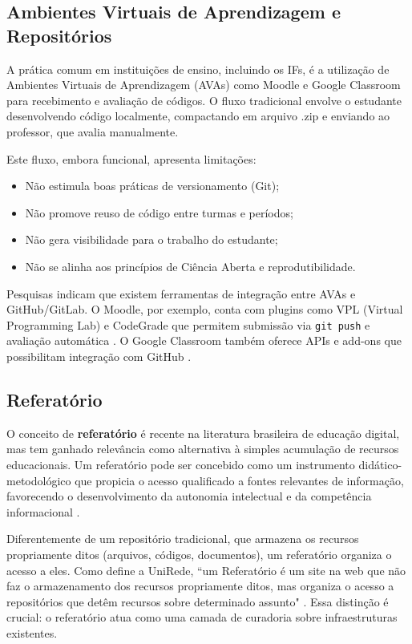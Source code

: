 \documentclass[english, spanish, brazilian]{RBIEarticle}
\begin{document}
	\subsection{Ambientes Virtuais de Aprendizagem e Repositórios}
	
	A prática comum em instituições de ensino, incluindo os IFs, é a utilização de Ambientes Virtuais de Aprendizagem (AVAs) como Moodle e Google Classroom para recebimento e avaliação de códigos. O fluxo tradicional envolve o estudante desenvolvendo código localmente, compactando em arquivo .zip e enviando ao professor, que avalia manualmente.
	
	Este fluxo, embora funcional, apresenta limitações:
	\begin{itemize}
		\item Não estimula boas práticas de versionamento (Git);
		\item Não promove reuso de código entre turmas e períodos;
		\item Não gera visibilidade para o trabalho do estudante;
		\item Não se alinha aos princípios de Ciência Aberta e reprodutibilidade.
	\end{itemize}
	
	Pesquisas indicam que existem ferramentas de integração entre AVAs e GitHub/GitLab. O Moodle, por exemplo, conta com plugins como VPL (Virtual Programming Lab) e CodeGrade que permitem submissão via \texttt{git push} e avaliação automática \cite{moodle2024}. O Google Classroom também oferece APIs e add-ons que possibilitam integração com GitHub \cite{google2024}.
	
	
	\subsection{Referatório}	
	O conceito de \textbf{referatório} é recente na literatura brasileira de educação digital, mas tem ganhado relevância como alternativa à simples acumulação de recursos educacionais. Um referatório pode ser concebido como um instrumento didático-metodológico que propicia o acesso qualificado a fontes relevantes de informação, favorecendo o desenvolvimento da autonomia intelectual e da competência informacional \cite{cecead_referatorio}.
	
	Diferentemente de um repositório tradicional, que armazena os recursos propriamente ditos (arquivos, códigos, documentos), um referatório organiza o acesso a eles. Como define a UniRede, ``um Referatório é um site na web que não faz o armazenamento dos recursos propriamente ditos, mas organiza o acesso a repositórios que detêm recursos sobre determinado assunto" \cite{unirede_referatorio}. Essa distinção é crucial: o referatório atua como uma camada de curadoria sobre infraestruturas existentes.
	
\end{document}
